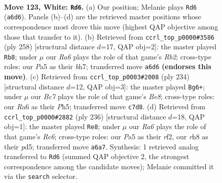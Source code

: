 \documentclass[11pt]{article}
\begin{document}
\clearpage

\begin{figure}[p]\centering
\begin{subfigure}{0.46\textwidth}\centering
\resizebox{\linewidth}{!}{%
\newchessgame
\chessboard[
  setfen={7r/2B4k/R7/P7/4K3/8/8/8 w - - 15 123},
  showmover=false,
  pgfstyle=straightmove, color=movearrow, markmove={a6-d6}
]}
\caption{}
\end{subfigure}\hfill
\begin{subfigure}{0.46\textwidth}\centering
\resizebox{\linewidth}{!}{%
\newchessgame
\chessboard[
  setfen={8/7b/k3r2P/2K5/5B2/8/1R6/8 w - - 25 130},
  showmover=false,
  pgfstyle=straightmove, color=movearrow, markmove={b2-b8}
]}
\caption{}
\end{subfigure}
\\[4pt]
\begin{subfigure}{0.46\textwidth}\centering
\resizebox{\linewidth}{!}{%
\newchessgame
\chessboard[
  setfen={4B3/8/7p/5k1P/5r2/3K4/8/8 w - - 13 118},
  showmover=false,
  pgfstyle=straightmove, color=movearrow, markmove={e8-g6}
]}
\caption{}
\end{subfigure}\hfill
\begin{subfigure}{0.46\textwidth}\centering
\resizebox{\linewidth}{!}{%
\newchessgame
\chessboard[
  setfen={8/8/4R3/3pP3/3k4/7K/5r2/8 w - - 0 119},
  showmover=false,
  pgfstyle=straightmove, color=movearrow, markmove={e6-e8}
]}
\caption{}
\end{subfigure}
\caption{\textbf{Move 123, White: \texttt{Rd6}.} (a) Our position; Melanie plays \texttt{Rd6} (\texttt{a6d6}). Panels (b)--(d) are the retrieved master positions whose correspondence most drove this move (highest QAP objective among those that transfer to it). (b) Retrieved from \texttt{ccrl\_top\_p0000\#3586} (ply 258) [structural distance $d$=17, QAP obj=2]: the master played \texttt{Rb8}; under $\mu$ our \emph{Ra6} plays the role of that game's \emph{Rb2}; cross-type roles: our \emph{P}a5 as their \emph{b}h7; transferred move \texttt{a6d6} \textbf{(endorses this move)}. (c) Retrieved from \texttt{ccrl\_top\_p0003\#2008} (ply 234) [structural distance $d$=12, QAP obj=3]: the master played \texttt{Bg6+}; under $\mu$ our \emph{Bc7} plays the role of that game's \emph{Be8}; cross-type roles: our \emph{R}a6 as their \emph{P}h5; transferred move \texttt{c7d8}. (d) Retrieved from \texttt{ccrl\_top\_p0000\#2882} (ply 236) [structural distance $d$=18, QAP obj=1]: the master played \texttt{Re8}; under $\mu$ our \emph{Ra6} plays the role of that game's \emph{Re6}; cross-type roles: our \emph{P}a5 as their \emph{r}f2, our \emph{r}h8 as their \emph{p}d5; transferred move \texttt{a6a7}. Synthesis: 1 retrieved analog transferred to \texttt{Rd6} (summed QAP objective 2, the strongest correspondence among the candidate moves); Melanie committed it via the \texttt{search} selector.}
\label{fig:thought-m244}
\end{figure}
\end{document}
